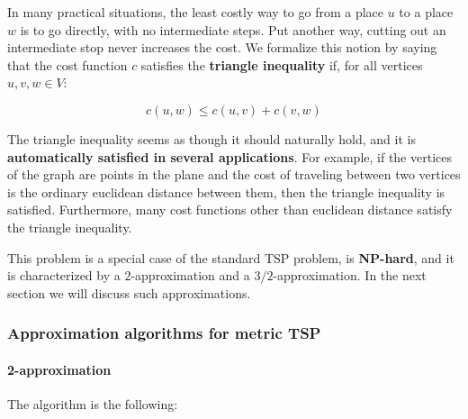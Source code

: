 
In many practical situations, the least costly way to go from a place $u$ to a place $w$ is to go directly, with no intermediate steps. Put another way, cutting out an intermediate stop never increases the cost. We formalize this notion by saying that the cost function $c$ satisfies the \textbf{triangle inequality} if, for all vertices $u,v,w \in V$:

$$
c(u,w) \leq c(u,v) + c(v,w)
$$

The triangle inequality seems as though it should naturally hold, and it is \textbf{automatically satisfied in several applications}. For example, if the vertices of the graph are points in the plane and the cost of traveling between two vertices is the ordinary euclidean distance between them, then the triangle inequality is satisfied. Furthermore, many cost functions other than euclidean distance satisfy the triangle inequality.


This problem is a special case of the standard TSP problem, is \textbf{NP-hard}, and it is characterized by a $2$-approximation and a $3/2$-approximation. In the next section we will discuss such approximations.

\subsubsection{Approximation algorithms for metric TSP}
\paragraph{2-approximation}

The algorithm is the following:

